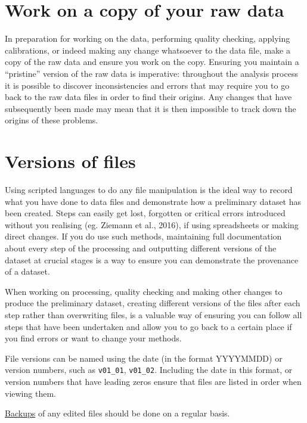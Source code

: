\documentclass[a4paper,oneside]{report}
\begin{document}
\hypertarget{work-on-a-copy-of-your-raw-data}{%
\section{Work on a copy of your raw
data}\label{work-on-a-copy-of-your-raw-data}}

In preparation for working on the data, performing quality checking,
applying calibrations, or indeed making any change whatsoever to the
data file, make a copy of the raw data and ensure you work on the copy.
Ensuring you maintain a ``pristine'' version of the raw data is
imperative: throughout the analysis process it is possible to discover
inconsistencies and errors that may require you to go back to the raw
data files in order to find their origins. Any changes that have
subsequently been made may mean that it is then impossible to track down
the origins of these problems.

\hypertarget{versions-of-files}{%
\section{Versions of files}\label{versions-of-files}}

Using scripted languages to do any file manipulation is the ideal way to
record what you have done to data files and demonstrate how a
preliminary dataset has been created. Steps can easily get lost,
forgotten or critical errors introduced without you realising (eg.
Ziemann et al., 2016), if using spreadsheets or making direct changes.
If you do use such methods, maintaining full documentation about every
step of the processing and outputting different versions of the dataset
at crucial stages is a way to ensure you can demonstrate the provenance
of a dataset.

When working on processing, quality checking and making other changes to
produce the preliminary dataset, creating different versions of the
files after each step rather than overwriting files, is a valuable way
of ensuring you can follow all steps that have been undertaken and allow
you to go back to a certain place if you find errors or want to change
your methods.

File versions can be named using the date (in the format YYYYMMDD) or
version numbers, such as \texttt{v01\_01}, \texttt{v01\_02}. Including
the date in this format, or version numbers that have leading zeros
ensure that files are listed in order when viewing them.

\protect\hyperlink{backing-up-data}{Backups} of any edited files should
be done on a regular basis.
\end{document}
